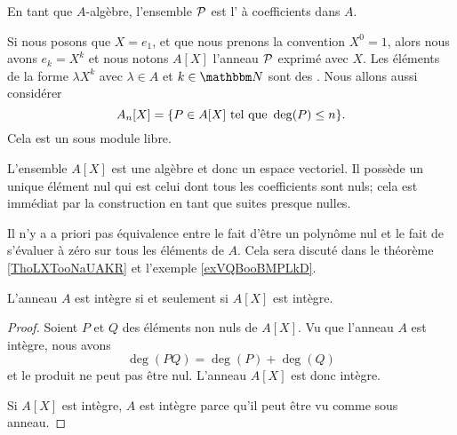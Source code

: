 \begin{definition}  \label{DefRGOooGIVzkx}
    En tant que \( A\)-algèbre, l'ensemble \( \mathcal{P}\) est l' à coefficients dans \( A\).
\end{definition}

Si nous posons que \( X=e_1\), et que nous prenons la convention \( X^0=1\), alors nous avons \( e_k=X^k\) et nous notons \( A[X]\) l'anneau \( \mathcal{P}\) exprimé avec \( X\). Les éléments de la forme \( \lambda X^k\) avec \( \lambda\in A\) et \( k\in\eN\) sont des . Nous allons aussi considérer
\begin{equation}
    A_n[X]=\{ P\in A[X]\text{ tel que } \deg(P)\leq n \}.
\end{equation}
Cela est un sous module libre.

\begin{remark}  \label{RemLIOooXHePSd}
    L'ensemble \( A[X]\) est une algèbre et donc un espace vectoriel. Il possède un unique élément nul qui est celui dont tous les coefficients sont nuls; cela est immédiat par la construction en tant que suites presque nulles.

    Il n'y a a priori pas équivalence entre le fait d'être un polynôme nul et le fait de s'évaluer à zéro sur tous les éléments de \( A\). Cela sera discuté dans le théorème \ref{ThoLXTooNaUAKR} et l'exemple \ref{exVQBooBMPLkD}.
\end{remark}

\begin{theorem}     \label{ThoBUEDrJ}
    L'anneau \( A\) est intègre si et seulement si \( A[X]\) est intègre.
\end{theorem}

\begin{proof}
    Soient \( P\) et \( Q\) des éléments non nuls de \( A[X]\). Vu que l'anneau \( A\) est intègre, nous avons
    \begin{equation}
        \deg(PQ)=\deg(P)+\deg(Q)
    \end{equation}
    et le produit ne peut pas être nul. L'anneau \( A[X]\) est donc intègre.

    Si \( A[X]\) est intègre, \( A\) est intègre parce qu'il peut être vu comme sous anneau.
\end{proof}

